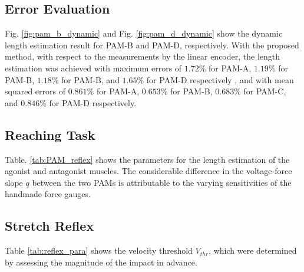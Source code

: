 \vspace{1cm}

\subsection{Error Evaluation} 
Fig. \ref{fig:pam_b_dynamic} and Fig. \ref{fig:pam_d_dynamic} show the dynamic length estimation result for PAM-B and PAM-D, respectively.
With the proposed method, with respect to the measurements by the linear encoder, the length estimation was achieved with maximum errors of $1.72\%$ for PAM-A, $1.19\%$ for PAM-B, $1.18\%$ for PAM-B, and  $1.65\%$ for PAM-D respectively , and with mean squared errors of $0.861\%$ for PAM-A, $0.653\%$ for PAM-B, $0.683\%$ for PAM-C, and $0.846\%$ for PAM-D respectively.

\subsection{Reaching Task}
Table. \ref{tab:PAM_reflex} shows the parameters for the length estimation of the agonist and antagonist muscles. The considerable difference in the voltage-force slope $q$  between the two PAMs is attributable to the varying sensitivities of the handmade force gauges.

\begin{table}[H]
    \centering
    \caption{Parameters for Length Estimation} 
    \label{tab:PAM_reflex}
\end{table}


\subsection{Stretch Reflex}
Table \ref{tab:reflex_para} shows the velocity threshold $V_{thr}$, which were determined by assessing the magnitude of the impact in advance. 

